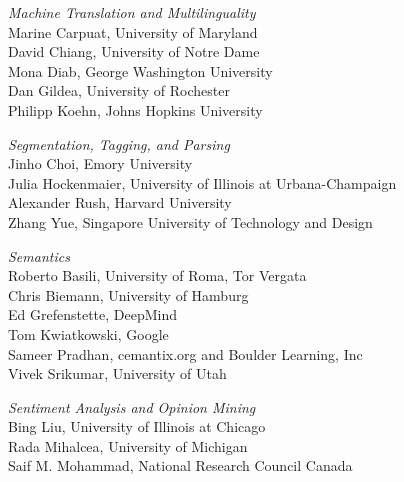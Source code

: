 \emph{Machine Translation and Multilinguality} \\
\hspace*{0.2in} Marine Carpuat, University of Maryland \\
\hspace*{0.2in} David Chiang, University of Notre Dame \\
\hspace*{0.2in} Mona Diab, George Washington University \\
\hspace*{0.2in} Dan Gildea, University of Rochester \\
\hspace*{0.2in} Philipp Koehn, Johns Hopkins University


\emph{Segmentation, Tagging, and Parsing} \\
\hspace*{0.2in} Jinho Choi, Emory University \\
\hspace*{0.2in} Julia Hockenmaier, University of Illinois at Urbana-Champaign \\
\hspace*{0.2in} Alexander Rush, Harvard University \\
\hspace*{0.2in} Zhang Yue, Singapore University of Technology and Design


\emph{Semantics} \\
\hspace*{0.2in} Roberto Basili, University of Roma, Tor Vergata \\
\hspace*{0.2in} Chris Biemann, University of Hamburg \\
\hspace*{0.2in} Ed Grefenstette, DeepMind \\
\hspace*{0.2in} Tom Kwiatkowski, Google \\
\hspace*{0.2in} Sameer Pradhan, cemantix.org and Boulder Learning, Inc \\
\hspace*{0.2in} Vivek Srikumar, University of Utah


\emph{Sentiment Analysis and Opinion Mining} \\
\hspace*{0.2in} Bing Liu, University of Illinois at Chicago \\
\hspace*{0.2in} Rada Mihalcea, University of Michigan \\
\hspace*{0.2in} Saif M. Mohammad, National Research Council Canada



